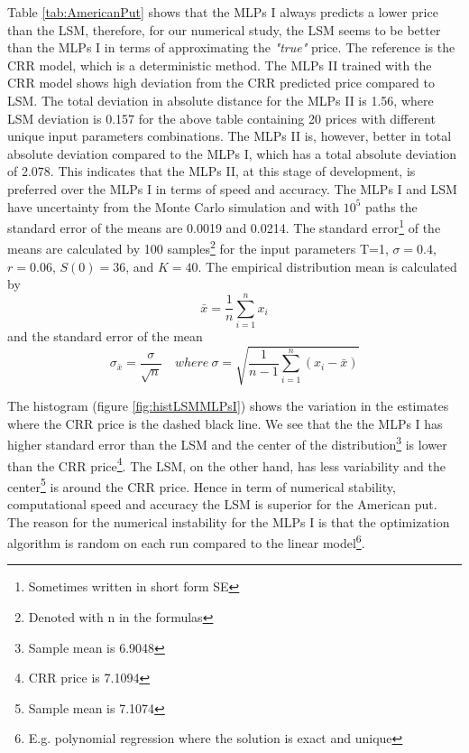 Table \ref{tab:AmericanPut} shows that the MLPs I always predicts a lower price than the LSM, therefore, for our numerical study, the LSM seems to be better than the MLPs I in terms of approximating the \textsl{"true"} price. The reference is the CRR model, which is a deterministic method. The MLPs II trained with the CRR model shows high deviation from the CRR predicted price compared to LSM. The total deviation in absolute distance for the MLPs II is 1.56, where LSM deviation is 0.157 for the above table containing 20 prices with different unique input parameters combinations. The MLPs II is, however, better in total absolute deviation compared to the MLPs I, which has a total absolute deviation of 2.078. This indicates that the MLPs II, at this stage of development, is preferred over the MLPs I in terms of speed and accuracy. The MLPs I and LSM have uncertainty from the Monte Carlo simulation and with $10^5$ paths the standard error of the means are 0.0019 and 0.0214. The standard error\footnote{Sometimes written in short form SE} of the means are calculated by 100 samples\footnote{Denoted with n in the formulas} for the input parameters T=1, $\sigma=0.4$, $r=0.06$, $S(0)=36$, and $K=40$. The empirical distribution mean is calculated by
$$\bar{x}= \frac{1}{n}\sum_{i=1}^{n} x_i$$
and the standard error of the mean
$$\sigma_{\bar{x}}= \frac{\sigma}{\sqrt{n}} \quad where \ \sigma=\sqrt{\frac{1}{n-1}\sum_{i=1}^{n} (x_i-\bar{x})}$$
 
The histogram (figure \ref{fig:histLSMMLPsI}) shows the variation in the estimates where the CRR price is the dashed black line. We see that the the MLPs I has higher standard error than the LSM and the center of the distribution\footnote{Sample mean is 6.9048} is lower than the CRR price\footnote{CRR price is 7.1094}. The LSM, on the other hand, has less variability and the center\footnote{Sample mean is 7.1074} is around the CRR price. Hence in term of numerical stability, computational speed and accuracy the LSM is superior for the American put. The reason for the numerical instability for the MLPs I is that the optimization algorithm is random on each run compared to the linear model\footnote{E.g. polynomial regression where the solution is exact and unique}.\\

